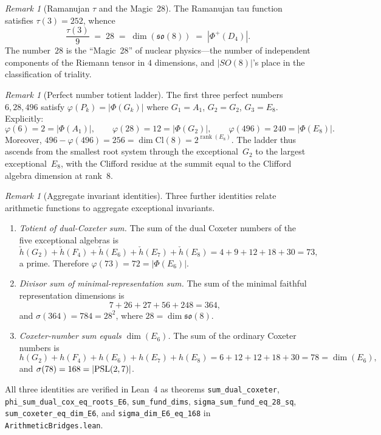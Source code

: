 \documentclass[11pt]{amsart}
\theoremstyle{plain}
\theoremstyle{definition}
\theoremstyle{remark}
\newtheorem{remark}[theorem]{Remark}
\renewcommand{\Phi}{\varPhi}
\newcommand{\rank}{\operatorname{rank}}
\begin{document}
\begin{remark}[Ramanujan $\tau$ and the Magic~28]\label{rem:tau-magic28}
The Ramanujan tau function satisfies $\tau(3) = 252$, whence
\[
  \frac{\tau(3)}{9} \;=\; 28 \;=\; \dim(\mathfrak{so}(8))
  \;=\; |\Phi^+(D_4)|.
\]
The number~$28$ is the ``Magic~28'' of nuclear physics---the number of
independent components of the Riemann tensor in $4$ dimensions, and
$|SO(8)|$'s place in the classification of triality.
\end{remark}

\begin{remark}[Perfect number totient ladder]\label{rem:perfect-ladder}
The first three perfect numbers $6, 28, 496$ satisfy
$\varphi(P_k) = |\Phi(G_k)|$ where $G_1 = A_1$, $G_2 = G_2$,
$G_3 = E_8$.  Explicitly:
\[
  \varphi(6) = 2 = |\Phi(A_1)|, \qquad
  \varphi(28) = 12 = |\Phi(G_2)|, \qquad
  \varphi(496) = 240 = |\Phi(E_8)|.
\]
Moreover, $496 - \varphi(496) = 256 = \dim\mathrm{Cl}(8) = 2^{\rank(E_8)}$.
The ladder thus ascends from the smallest root system through the
exceptional~$G_2$ to the largest exceptional~$E_8$, with the
Clifford residue at the summit equal to the Clifford algebra dimension
at rank~$8$.
\end{remark}

\begin{remark}[Aggregate invariant identities]\label{rem:aggregate}
Three further identities relate arithmetic functions to aggregate
exceptional invariants.
\begin{enumerate}
  \item \emph{Totient of dual-Coxeter sum.}
    The sum of the dual Coxeter numbers of the five exceptional algebras is
    \[
      \check{h}(G_2)+\check{h}(F_4)+\check{h}(E_6)+\check{h}(E_7)
        +\check{h}(E_8) = 4+9+12+18+30 = 73,
    \]
    a prime.  Therefore $\varphi(73) = 72 = |\Phi(E_6)|$.

  \item \emph{Divisor sum of minimal-representation sum.}
    The sum of the minimal faithful representation dimensions is
    \[
      7+26+27+56+248 = 364,
    \]
    and $\sigma(364) = 784 = 28^2$, where $28 = \dim\mathfrak{so}(8)$.

  \item \emph{Coxeter-number sum equals $\dim(E_6)$.}
    The sum of the ordinary Coxeter numbers is
    \[
      h(G_2)+h(F_4)+h(E_6)+h(E_7)+h(E_8) = 6+12+12+18+30 = 78
      = \dim(E_6),
    \]
    and $\sigma(78) = 168 = |{\rm PSL}(2,7)|$.
\end{enumerate}
All three identities are verified in Lean~4 as theorems
\texttt{sum\_dual\_coxeter}, \texttt{phi\_sum\_dual\_cox\_eq\_roots\_E6},
\texttt{sum\_fund\_dims}, \texttt{sigma\_sum\_fund\_eq\_28\_sq},
\texttt{sum\_coxeter\_eq\_dim\_E6}, and \texttt{sigma\_dim\_E6\_eq\_168}
in \texttt{ArithmeticBridges.lean}.
\end{remark}
\end{document}
